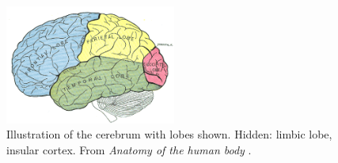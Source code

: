 \begin{figure}
	\centering
	\includegraphics[width=0.5\textwidth]{Figs/brain.png}
	\caption{Illustration of the cerebrum with lobes shown. Hidden: limbic lobe, insular cortex. From {\em Anatomy of the human body} \cite[Fig. 728]{graysAnatomy}.}
	\label{fig:brain}
\end{figure}

